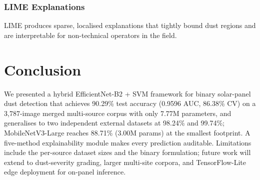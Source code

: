 \documentclass{IEEEtran}
\begin{document}
\subsubsection{LIME Explanations}
LIME produces sparse, localised explanations that tightly bound dust regions and are interpretable for non-technical operators in the field.

\section{Conclusion}

We presented a hybrid EfficientNet-B2 + SVM framework for binary solar-panel dust detection that achieves 90.29\% test accuracy (0.9596 AUC, 86.38\% CV) on a 3,787-image merged multi-source corpus with only 7.77M parameters, and generalises to two independent external datasets at 98.24\% and 99.74\%; MobileNetV3-Large reaches 88.71\% (3.00M params) at the smallest footprint. A five-method explainability module makes every prediction auditable. Limitations include the per-source dataset sizes and the binary formulation; future work will extend to dust-severity grading, larger multi-site corpora, and TensorFlow-Lite edge deployment for on-panel inference.



\end{document}
